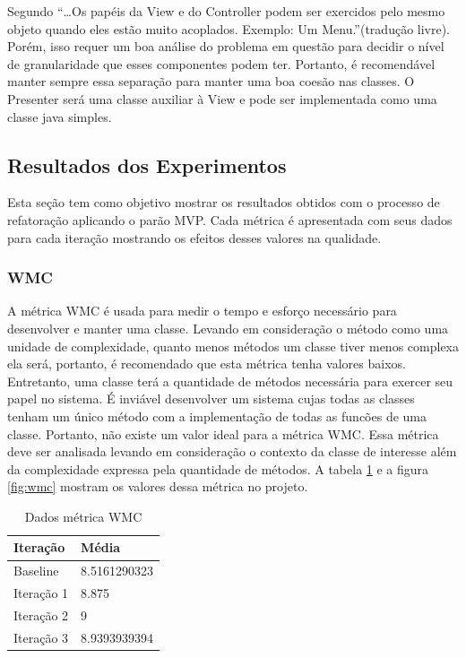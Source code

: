 \documentclass[conference]{IEEEtran}
\begin{document}
Segundo \cite{Reenskaug:1979} ``\ldots Os papéis da View e do
Controller podem ser exercidos pelo mesmo objeto quando eles estão muito
acoplados. Exemplo: Um Menu.''(tradução livre). Porém, isso requer um boa
análise do problema em questão para decidir o nível de granularidade que esses componentes podem ter.
Portanto, é recomendável manter sempre essa separação para manter uma boa coesão
nas classes. O Presenter será uma classe auxiliar à View e pode ser implementada
como uma classe java simples. 



\subsection{Resultados dos Experimentos}

Esta seção tem como objetivo mostrar os resultados obtidos com o processo de
refatoração aplicando o parão MVP. Cada métrica é apresentada com seus dados
para cada iteração mostrando os efeitos desses valores na qualidade.

\subsubsection{WMC}

A métrica WMC é usada para medir o tempo e esforço necessário para desenvolver e
manter uma classe. Levando em consideração o método como uma unidade de
complexidade, quanto menos métodos um classe tiver menos complexa ela será,
portanto, é recomendado que esta métrica tenha valores baixos.
Entretanto, uma classe terá a quantidade de métodos necessária para exercer seu
papel no sistema. É inviável desenvolver um sistema cujas todas as classes
tenham um único método com a implementação de todas as funcões de uma
classe. Portanto, não existe um valor ideal para a métrica WMC. Essa métrica
deve ser analisada levando em consideração o contexto da classe de interesse além da
complexidade expressa pela quantidade de métodos.  A tabela \ref{tab:wmc} e a
figura \ref{fig:wmc} mostram os valores dessa métrica no projeto.


\begin{table}[!h]
	\centering
	\caption{\label{tab:wmc}Dados métrica WMC}
    \begin{tabular}{ | l | l | }
    \hline
    Iteração & Média 			\\ \hline
    Baseline & 8.5161290323   	\\ \hline
    Iteração 1 & 8.875			\\ \hline
	Iteração 2 & 9				\\ \hline
	Iteração 3 & 8.9393939394	\\ \hline
    \end{tabular}
    

\end{table}
\end{document}

